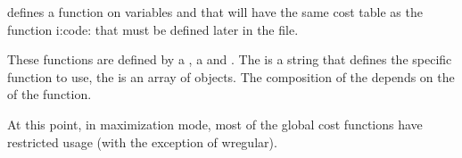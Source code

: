 \documentclass[letterpaper,10pt,openany,oneside,english]{sphinxmanual}
\begin{document}
\sphinxAtStartPar
defines a function on variables  and  that will have the same cost table as the function i:code: that must be defined later in the file.

\sphinxAtStartPar
{}

\sphinxAtStartPar
These functions are defined by a , a  and . The  is a string that defines the specific function to use, the  is an array of objects. The composition of the  depends on the  of the function.

\sphinxAtStartPar
At this point, in maximization mode, most of the global cost functions have restricted usage (with the exception of wregular).

\sphinxAtStartPar
{}
\end{document}
